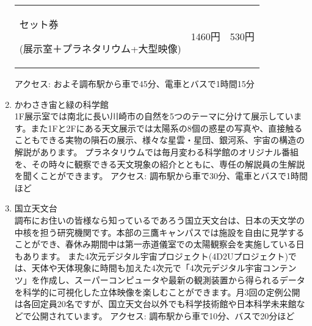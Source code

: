 \documentclass[supernova_2023]{subfiles}
\begin{document}
\begin{enumerate}
{\begin{tabularx}{80mm}{X|c|c}
      セット券\par {\scriptsize (展示室＋プラネタリウム+大型映像)} & 1460円 & 530円 \\
    \end{tabularx}
  }
  \vspace{-\zw}アクセス: およそ調布駅から車で45分、電車とバスで1時間15分
  \vspace{\zw}
  \item {}
  かわさき宙と緑の科学館\mbox{}\\1F展示室では南北に長い川崎市の自然を5つのテーマに分けて展示しています。また1Fと2Fにある天文展示では太陽系の8個の惑星の写真や、直接触ることもできる実物の隕石の展示、様々な星雲・星団、銀河系、宇宙の構造の解説があります。
  プラネタリウムでは毎月変わる科学館のオリジナル番組を、その時々に観察できる天文現象の紹介とともに、専任の解説員の生解説を聞くことができます。 
  \vspace{-\zw}アクセス: 調布駅から車で30分、電車とバスで1時間ほど
  \vspace{\zw}
  \item {}
  国立天文台\mbox{}\\調布にお住いの皆様なら知っているであろう国立天文台は、日本の天文学の中核を担う研究機関です。本部の三鷹キャンパスでは施設を自由に見学することができ、春休み期間中は第一赤道儀室での太陽観察会を実施している日もあります。
  また4次元デジタル宇宙プロジェクト(4D2Uプロジェクト)では、天体や天体現象に時間も加えた4次元で「4次元デジタル宇宙コンテンツ」を作成し、スーパーコンピュータや最新の観測装置から得られるデータを科学的に可視化した立体映像を楽しむことができます。月3回の定例公開は各回定員20名ですが、国立天文台以外でも科学技術館や日本科学未来館などで公開されています。
  \vspace{-\zw}アクセス: 調布駅から車で10分、バスで20分ほど

\end{enumerate}
\end{document}
